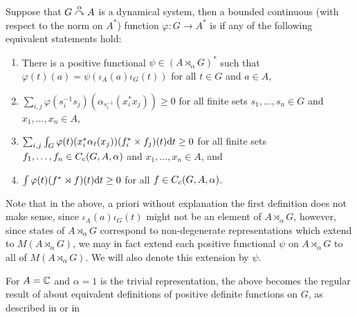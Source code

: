 \begin{definition}
Suppose that $G \stackrel{\alpha}{\curvearrowright} A$ is a dynamical system, then a bounded continuous (with respect to the norm on $A^*$) function $\varphi \colon G \to A^*$ is  if any of the following equivalent statements hold:
\begin{enumerate}
	\item There is a positive functional $\psi \in (A \rtimes_\alpha G)^*$ such that $\varphi(t)(a) = \psi(\iota_A(a) \iota_G(t))$ for all $t \in G$ and $a \in A$,
	\item $\sum_{i,j} \varphi (s_i^{-1}s_j)(\alpha_{s_{i}^{-1}}(x_{i}^* x_{j})) \geq 0 $ for all finite sets $s_1,\dots,s_n \in G$ and $x_1,\dots,x_n \in A$,
	\item $\sum_{i,j}\int_G \varphi(t)(x_{i}^*\alpha_t(x_j))(f_i^* \times f_j)(t) \mathrm{d} t \geq 0$ for all finite sets $f_1,\dots,f_n \in C_c(G,A,\alpha)$ and $x_1,\dots,x_n \in A$, and
	\item $\int \varphi(t)(f^* \rtimes f)(t) \mathrm{d} t \geq 0$ for all $f \in C_c(G,A,\alpha)$.
\end{enumerate}
\end{definition}
\begin{remark}
Note that in the above, a priori without explanation the first definition does not make sense, since $\iota_A(a) \iota_G(t)$ might not be an element of $A \rtimes_\alpha G$, however, since states of $A \rtimes_\alpha G$ correspond to non-degenerate representations which extend to $M(A \rtimes_\alpha G)$, we may in fact extend each positive functional $\psi$ on $A \rtimes_\alpha G$ to all of $M(A \rtimes_\alpha G)$. We will also denote this extension by $\psi$. 
\end{remark}
For $A = \mathbb{C}$ and $\alpha = 1$ is the trivial representation, the above becomes the regular result of about equivalent definitions of positive definite functions on $G$, as described in \cite{folland2016fourier} or in \cite{pedersenalgauto} 

